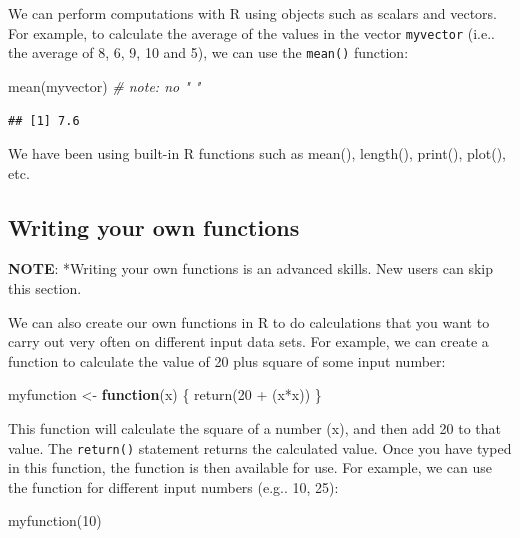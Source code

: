 \documentclass[
]{book}
\newenvironment{Shaded}{\begin{snugshade}}{\end{snugshade}}
\newcommand{\CommentTok}[1]{\textcolor[rgb]{0.56,0.35,0.01}{\textit{#1}}}
\newcommand{\ControlFlowTok}[1]{\textcolor[rgb]{0.13,0.29,0.53}{\textbf{#1}}}
\newcommand{\DecValTok}[1]{\textcolor[rgb]{0.00,0.00,0.81}{#1}}
\newcommand{\FunctionTok}[1]{\textcolor[rgb]{0.00,0.00,0.00}{#1}}
\newcommand{\NormalTok}[1]{#1}
\newcommand{\OtherTok}[1]{\textcolor[rgb]{0.56,0.35,0.01}{#1}}
\newcommand{\SpecialCharTok}[1]{\textcolor[rgb]{0.00,0.00,0.00}{#1}}
\begin{document}
We can perform computations with R using objects such as scalars and vectors. For example, to calculate the average of the values in the vector \texttt{myvector} (i.e.. the average of 8, 6, 9, 10 and 5), we can use the \texttt{mean()} function:

\begin{Shaded}
\begin{Highlighting}[]
\FunctionTok{mean}\NormalTok{(myvector) }\CommentTok{\# note: no " "}
\end{Highlighting}
\end{Shaded}

\begin{verbatim}
## [1] 7.6
\end{verbatim}

We have been using built-in R functions such as mean(), length(), print(), plot(), etc.

\hypertarget{writing-your-own-functions}{%
\subsection{Writing your own functions}\label{writing-your-own-functions}}

\textbf{NOTE}: *Writing your own functions is an advanced skills. New users can skip this section.

We can also create our own functions in R to do calculations that you want to carry out very often on different input data sets. For example, we can create a function to calculate the value of 20 plus square of some input number:

\begin{Shaded}
\begin{Highlighting}[]
\NormalTok{myfunction }\OtherTok{\textless{}{-}} \ControlFlowTok{function}\NormalTok{(x) \{ }\FunctionTok{return}\NormalTok{(}\DecValTok{20} \SpecialCharTok{+}\NormalTok{ (x}\SpecialCharTok{*}\NormalTok{x)) \}}
\end{Highlighting}
\end{Shaded}

This function will calculate the square of a number (x), and then add 20 to that value. The \texttt{return()} statement returns the calculated value. Once you have typed in this function, the function is then available for use. For example, we can use the function for different input numbers (e.g.. 10, 25):

\begin{Shaded}
\begin{Highlighting}[]
\FunctionTok{myfunction}\NormalTok{(}\DecValTok{10}\NormalTok{)}
\end{Highlighting}
\end{Shaded}
\end{document}
